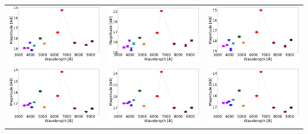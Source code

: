 \begin{table}[!h]
\begin{tabular}{ccc}
\includegraphics[width=0.3\linewidth, clip]{photopectrum_splus_MC0116-015280_aper.pdf} & \includegraphics[width=0.3\linewidth, clip]{photopectrum_splus_MC0116-015280_auto.pdf} & \includegraphics[width=0.3\linewidth, clip]{photopectrum_splus_MC0116-015280_petro.pdf} \\
\includegraphics[width=0.3\linewidth, clip]{photopectrum_splus_MC0116-172101_aper.pdf} & \includegraphics[width=0.3\linewidth, clip]{photopectrum_splus_MC0116-172101_auto.pdf} & \includegraphics[width=0.3\linewidth, clip]{photopectrum_splus_MC0116-172101_petro.pdf} \\

\end{tabular}
\end{table}
